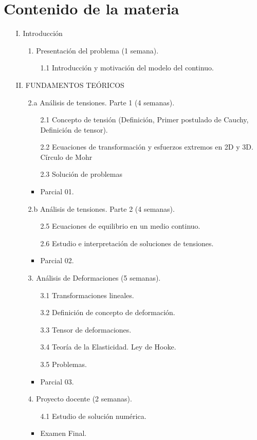 \section*{Contenido de la materia}
\begin{itemize}
	\item[I.] Introducción
	\begin{itemize}
		\item[1.] Presentación del problema (1 semana).
		\begin{itemize}
			\item[1.1] Introducción y motivación del modelo del continuo. 
		\end{itemize}
	\end{itemize}

	\item[II.] FUNDAMENTOS TEÓRICOS
	\begin{itemize}
		\item[2.a] Análisis de tensiones. Parte 1 (4 semanas).
		\begin{itemize}
			\item[2.1] Concepto de tensión (Definición, Primer postulado de Cauchy, Definición de tensor).			
			\item[2.2] Ecuaciones de transformación y esfuerzos extremos en 2D y 3D. Círculo de Mohr
			\item[2.3] Solución de problemas
			\item Parcial 01.
		\end{itemize}			

		\item[2.b] Análisis de tensiones. Parte 2 (4 semanas).
		\begin{itemize}						
			\item[2.5] Ecuaciones de equilibrio en un medio continuo.
			\item[2.6] Estudio e interpretación de soluciones de tensiones.
			\item Parcial 02.
		\end{itemize}
		
		\item[3.] Análisis de Deformaciones (5 semanas).
		\begin{itemize}
			\item[3.1] Transformaciones lineales.
			\item[3.2] Definición de concepto de deformación.
			\item[3.3] Tensor de deformaciones.
			\item[3.4] Teoría de la Elasticidad. Ley de Hooke.
			\item[3.5] Problemas.
			\item Parcial 03.
		\end{itemize}
		
		\item[4.] Proyecto docente (2 semanas).
		\begin{itemize}
		\item[4.1] Estudio de solución numérica. 
		\item Examen Final.
		\end{itemize}
	\end{itemize}
\end{itemize}


